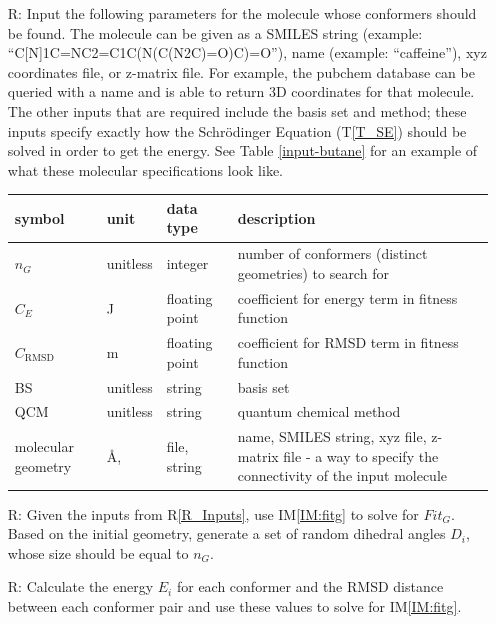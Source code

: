 \documentclass[12pt]{article}
\newcommand{\tref}[1]{T\ref{#1}}
\newcommand{\iref}[1]{IM\ref{#1}}
\newcounter{reqnum} %
\newcommand{\rref}[1]{R\ref{#1}}
\begin{document}
\noindent \begin{itemize}

\item[R\refstepcounter{reqnum}\thereqnum \label{R_Inputs}:] Input the following 
parameters for the molecule whose conformers should be found. The molecule can 
be given as a SMILES string (example: ``C[N]1C=NC2=C1C(N(C(N2C)=O)C)=O''), name 
(example: ``caffeine''), xyz coordinates file, or z-matrix file. For example, 
the pubchem database can be queried with a name and is able to return 3D 
coordinates for that molecule. The other inputs that are required include the 
basis set and method; these inputs specify exactly how the Schr\"{o}dinger 
Equation (\tref{T_SE}) should be solved in order to get the energy. See Table 
\ref{input-butane} for an example of what these molecular specifications look 
like. 

\begin{tabularx}{\textwidth}{p{1.7cm}p{2cm}p{2cm}X}
	\toprule
	symbol & unit & data type & description \\
	\midrule
	$n_G$ & unitless & integer & number of conformers (distinct geometries) 
	to search for \\
	$C_E$ & \si{\joule} & floating point & coefficient for energy term in 
	fitness function \\
	$C_\text{RMSD}$ & \si{\metre} & floating point & coefficient for RMSD term 
	in fitness function \\
	BS & unitless & string & basis set \\
	QCM & unitless & string & quantum chemical method \\
	molecular geometry & \si{\angstrom}, \textdegree & file, string & name, 
	SMILES 
	string, xyz file, z-matrix file - a way to specify the connectivity of 
	the input molecule \\
	\bottomrule
\end{tabularx}

\item[R\refstepcounter{reqnum}\thereqnum \label{R_OutputInputs}:] Given the 
inputs from \rref{R_Inputs}, use \iref{IM:fitg} to solve for $Fit_G$. Based on 
the initial geometry, generate a set of random dihedral angles $D_i$, whose 
size should be equal to $n_G$.

\item[R\refstepcounter{reqnum}\thereqnum \label{R_Calculate}:] Calculate the 
energy $E_i$ for each conformer and the RMSD distance between each conformer 
pair and use these values to solve for \iref{IM:fitg}. 


\end{itemize}
\end{document}
